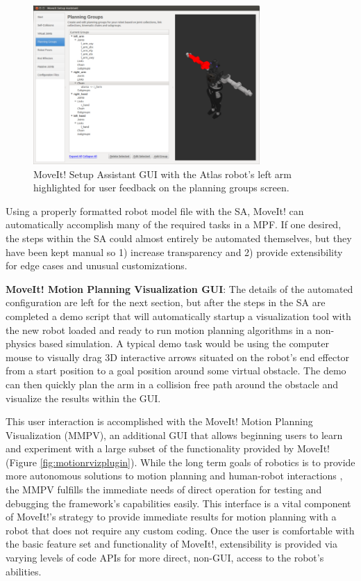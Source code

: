 \documentclass[10pt,journal,compsoc]{joser1}
\begin{document}
{\begin{figure}[!t]
\centering
\includegraphics[width=3.4in]{images/setup_assistant3}
\caption{MoveIt! Setup Assistant GUI with the Atlas robot's left arm highlighted for user feedback on the planning groups screen.}
\label{fig:setupassistant3}	
\end{figure}

Using a properly formatted robot model file with the SA, MoveIt! can automatically accomplish many of the required tasks in a MPF. If one desired, the steps within the SA could almost entirely be automated themselves, but they have been kept manual so 1) increase transparency and 2) provide extensibility for edge cases and unusual customizations.

{\bf MoveIt! Motion Planning Visualization GUI}: The details of the automated configuration are left for the next section, but after the steps in the SA are completed a demo script that will automatically startup a visualization tool with the new robot loaded and ready to run motion planning algorithms in a non-physics based simulation. A typical demo task would be using the computer mouse to visually drag 3D interactive arrows situated on the robot's end effector from a start position to a goal position around some virtual obstacle. The demo can then quickly plan the arm in a collision free path around the obstacle and visualize the results within the GUI. 

This user interaction is accomplished with the MoveIt! Motion Planning Visualization (MMPV), an additional GUI that allows beginning users to learn and experiment with a large subset of the functionality provided by MoveIt! (Figure \ref{fig:motionrvizplugin}). While the long term goals of robotics is to provide more autonomous solutions to motion planning and human-robot interactions \cite{yancotaxonomy}, the MMPV fulfills the immediate needs of direct operation for testing and debugging the framework's capabilities easily. This interface is a vital component of MoveIt!'s strategy to provide immediate results for motion planning with a robot that does not require any custom coding. Once the user is comfortable with the basic feature set and functionality of MoveIt!, extensibility is provided via varying levels of code APIs for more direct, non-GUI, access to the robot's abilities.

}
\end{document}
